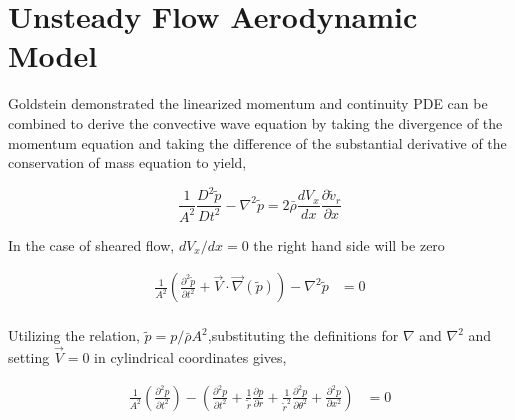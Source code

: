 \section{Unsteady Flow Aerodynamic Model}
\frame{\sectionpage}
\begin{frame}
    
Goldstein demonstrated the linearized momentum and continuity PDE  can be 
combined to derive the convective wave equation by taking the divergence of
the momentum equation and taking the difference of the substantial derivative
of the conservation of mass equation to yield,

\begin{equation}
    \frac{1}{A^2}\frac{D^2\tilde{p}}{Dt^2} -
    \nabla^2 \tilde{p} =
    2 \bar{\rho} \frac{d V_x}{d x} \frac{\partial  \tilde{v}_r}{ \partial x} 
    \label{eqn:KousensWaveEquation}
\end{equation}

\end{frame}
\begin{frame}
    

In the case of sheared flow, $dV_x/dx = 0$ the right hand side will be zero 



\begin{align*}
    \frac{1}{A^2}\left(
        \frac{\partial^2 \tilde{p}}{\partial t^2} + 
        \vec{V}\cdot \vec {\nabla} (\tilde{p}) 
    \right) -
    \nabla^2
    \tilde{p} &=
    0 \\
\end{align*}

\end{frame}
\begin{frame}

Utilizing the relation, $\tilde{p} = p/\bar{\rho} A^2$,substituting the 
definitions for $\nabla$ and $\nabla^2$ and setting $\vec{V} =0$
in cylindrical coordinates gives,



\begin{align*} 
    \frac{1}{A^2}\left(
        \frac{\partial^2 {p}}{\partial t^2}
    \right) - 
        \left(
            \frac{\partial^2 {p}}{\partial t^2} + 
            \frac{1}{\tilde{r}}\frac{\partial p}{\partial r} +
            \frac{1}{\tilde{r}^2} \frac{\partial^2 p}{\partial \theta^2} + 
            \frac{\partial^2 p}{\partial x^2} 
        \right) &= 0  
\end{align*} 

    
\end{frame}
